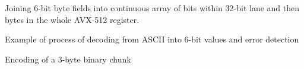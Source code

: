 \documentclass{article}
\begin{document}
\par\noindent Joining 6-bit byte fields into continuous array of bits within 32-bit lane and then bytes in the whole AVX-512 register.





\par\noindent Example of process of decoding from ASCII into 6-bit values and error detection





\par\noindent Encoding of a 3-byte binary chunk



\end{document}
